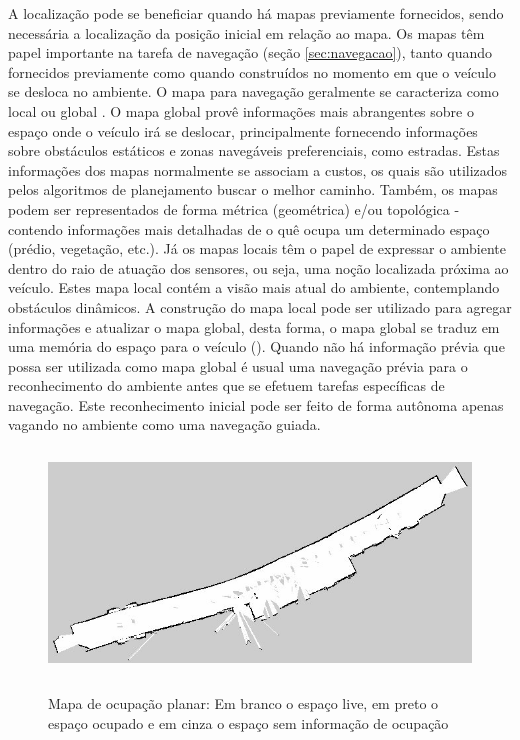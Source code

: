 A localização pode se beneficiar quando há mapas previamente fornecidos, sendo
necessária a localização da posição inicial em relação ao mapa. Os mapas têm
papel importante na tarefa de navegação (seção \ref{sec:navegacao}), tanto
quando fornecidos previamente como quando construídos no momento em que o
veículo se desloca no ambiente. O mapa para navegação geralmente se caracteriza como
local ou global \cite{concepts}. O mapa global provê informações mais
abrangentes sobre o espaço onde o veículo irá se deslocar, principalmente
fornecendo informações sobre obstáculos estáticos e zonas navegáveis
preferenciais, como estradas. Estas informações dos mapas normalmente se
associam a custos, os quais são utilizados pelos algoritmos de planejamento
buscar o melhor caminho. Também, os mapas podem ser representados de forma
métrica (geométrica) e/ou topológica - contendo informações mais detalhadas de o
quê ocupa um determinado espaço (prédio, vegetação, etc.)\cite{Thrun98a}. Já os
mapas locais têm o papel de expressar o ambiente dentro do raio de atuação dos
sensores, ou seja, uma noção localizada próxima ao veículo. Estes mapa local
contém a visão mais atual do ambiente, contemplando obstáculos dinâmicos. A
construção do mapa local pode ser utilizado para agregar informações e atualizar
o mapa global, desta forma, o mapa global se traduz em uma memória do espaço
para o veículo (). Quando não há informação prévia que possa ser
utilizada como mapa global é usual uma navegação prévia para o reconhecimento do
ambiente antes que se efetuem tarefas específicas de navegação. Este
reconhecimento inicial pode ser feito de forma autônoma apenas vagando no
ambiente como uma navegação guiada.

\begin{figure}[ht]
	\begin{minipage}[b]{0.9\linewidth}
	    \centering
	    \includegraphics[width=\textwidth,height=6cm]{images/map_2d.jpg}
	 	\caption{Mapa de ocupação planar: Em branco o espaço live, em preto o espaço
	 	ocupado e em cinza o espaço sem informação de ocupação}
	 	\label{fig:map2d}
	\end{minipage}
\end{figure}


